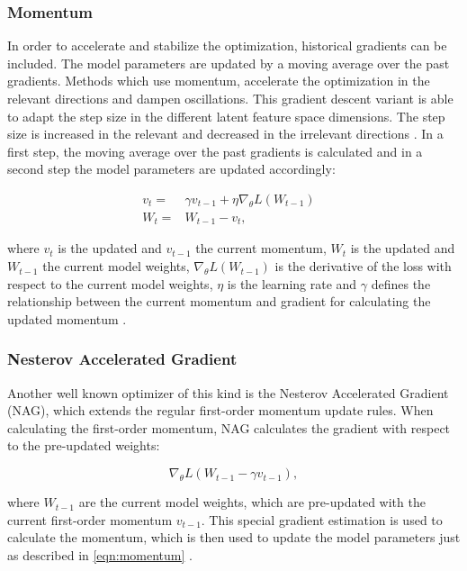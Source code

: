 \subsubsection{Momentum}
In order to accelerate and stabilize the optimization, historical gradients can be included. The model parameters are updated by a moving average over the past gradients. Methods which use momentum, accelerate the optimization in the relevant directions and dampen oscillations. This gradient descent variant is able to adapt the step size in the different latent feature space dimensions. The step size is increased in the relevant and decreased in the irrelevant directions \cite{Ruder2016}. In a first step, the moving average over the past gradients is calculated and in a second step the model parameters are updated accordingly:

    \begin{equation}
      \begin{aligned}
          v_{t} = & \gamma v_{t-1} +  \eta \nabla_{\theta}L(W_{t-1}) &\\
          W_{t} = &W_{t-1} - v_{t},
          \label{eqn:momentum}
      \end{aligned}
    \end{equation}

    where $v_{t}$ is the updated and $v_{t-1}$ the current momentum, $W_{t}$ is the updated and $W_{t-1}$ the current model weights, $\nabla_{\theta}L(W_{t-1})$ is the derivative of the loss with respect to the current model weights, $\eta$ is the learning rate and $\gamma$ defines the relationship between the current momentum and gradient for calculating the updated momentum \cite{Ruder2016}.

    
\subsubsection{Nesterov Accelerated Gradient}
Another well known optimizer of this kind is the Nesterov Accelerated Gradient (NAG), which extends the regular first-order momentum update rules. When calculating the first-order momentum, NAG calculates the gradient with respect to the pre-updated weights: 

\begin{equation}
    \nabla_{\theta}L( W_{t-1} - \gamma v_{t-1}),
\end{equation}
    
where $W_{t-1}$ are the current model weights, which are pre-updated with the current first-order momentum $v_{t-1}$. This special gradient estimation is used to calculate the momentum, which is then used to update the model parameters just as described in \ref{eqn:momentum} \cite{Ruder2016}.

